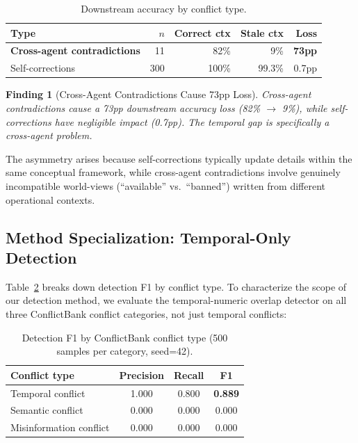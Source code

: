 \documentclass[11pt]{article}
\newtheorem{finding}{Finding}
\begin{document}
\begin{table}[h]
\centering
\caption{Downstream accuracy by conflict type.}
\begin{tabular}{lrrrr}
\toprule
Type & $n$ & Correct ctx & Stale ctx & Loss \\
\midrule
\textbf{Cross-agent contradictions} & 11 & 82\% & 9\% & \textbf{73pp} \\
Self-corrections & 300 & 100\% & 99.3\% & 0.7pp \\
\bottomrule
\end{tabular}
\label{tab:asymmetry}
\end{table}

\begin{finding}[Cross-Agent Contradictions Cause 73pp Loss]
Cross-agent contradictions cause a 73pp downstream accuracy loss (82\% $\to$ 9\%), while self-corrections have negligible impact (0.7pp). The temporal gap is specifically a \emph{cross-agent} problem.
\end{finding}

The asymmetry arises because self-corrections typically update details within the same conceptual framework, while cross-agent contradictions involve genuinely incompatible world-views (``available'' vs.\ ``banned'') written from different operational contexts.



\subsection{Method Specialization: Temporal-Only Detection}
\label{sec:specialization}

Table~\ref{tab:specialization} breaks down detection F1 by conflict type. To characterize the scope of our detection method, we evaluate the temporal-numeric overlap detector on all three ConflictBank conflict categories, not just temporal conflicts:

\begin{table}[h]
\centering
\caption{Detection F1 by ConflictBank conflict type (500 samples per category, seed=42).}
\begin{tabular}{lccc}
\toprule
Conflict type & Precision & Recall & F1 \\
\midrule
Temporal conflict & 1.000 & 0.800 & \textbf{0.889} \\
Semantic conflict & 0.000 & 0.000 & 0.000 \\
Misinformation conflict & 0.000 & 0.000 & 0.000 \\
\bottomrule
\end{tabular}
\label{tab:specialization}
\end{table}
\end{document}
